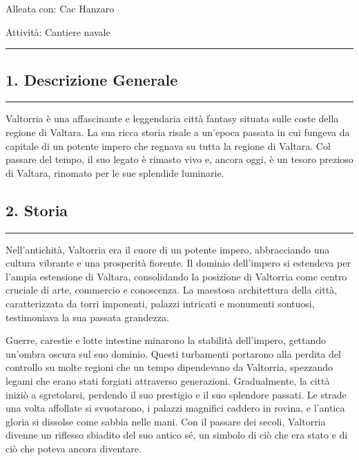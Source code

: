 Alleata con: Cac Hanzaro

Attività: Cantiere navale

\begin{center}\rule{0.5\linewidth}{0.5pt}\end{center}

\subsection{1. Descrizione Generale}\label{descrizione-generale}

\begin{center}\rule{0.5\linewidth}{0.5pt}\end{center}

Valtorria è una affascinante e leggendaria città fantasy situata sulle
coste della regione di Valtara. La sua ricca storia risale a un'epoca
passata in cui fungeva da capitale di un potente impero che regnava su
tutta la regione di Valtara. Col passare del tempo, il suo legato è
rimasto vivo e, ancora oggi, è un tesoro prezioso di Valtara, rinomato
per le sue splendide luminarie.

\subsection{2. Storia}\label{storia}

\begin{center}\rule{0.5\linewidth}{0.5pt}\end{center}

Nell'antichità, Valtorria era il cuore di un potente impero,
abbracciando una cultura vibrante e una prosperità fiorente. Il dominio
dell'impero si estendeva per l'ampia estensione di Valtara, consolidando
la posizione di Valtorria come centro cruciale di arte, commercio e
conoscenza. La maestosa architettura della città, caratterizzata da
torri imponenti, palazzi intricati e monumenti sontuosi, testimoniava la
sua passata grandezza.

Guerre, carestie e lotte intestine minarono la stabilità dell'impero,
gettando un'ombra oscura sul suo dominio. Questi turbamenti portarono
alla perdita del controllo su molte regioni che un tempo dipendevano da
Valtorria, spezzando legami che erano stati forgiati attraverso
generazioni. Gradualmente, la città iniziò a sgretolarsi, perdendo il
suo prestigio e il suo splendore passati. Le strade una volta affollate
si svuotarono, i palazzi magnifici caddero in rovina, e l'antica gloria
si dissolse come sabbia nelle mani. Con il passare dei secoli, Valtorria
divenne un riflesso sbiadito del suo antico sé, un simbolo di ciò che
era stato e di ciò che poteva ancora diventare.

